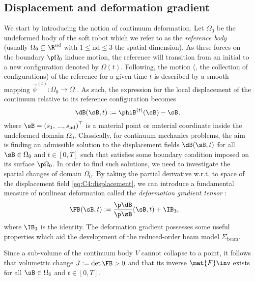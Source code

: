 \subsection{Displacement and deformation gradient}
We start by introducing the notion of continuum deformation. Let $\Omega_0$ be the undeformed body of the soft robot which we refer to as the \textit{reference body} (usually $\Omega_0 \subseteq \R^{\text{nd}}$ with $1 \le \text{nd} \le 3$ the spatial dimension). As these forces on the boundary $\p \Omega_0$ induce motion, the reference will transition from an initial to a new configuration denoted by $\Omega(t)$. Following, the motion (\ie, the collection of configurations) of the reference for a given time $t$ is described by a smooth mapping $\vec{\phi}^{(t)}: \Omega_0 \to \Omega$ \cite{Holzapfel2002,Kim2018,Laursen2001}.
As such, the expression for the local displacement of the continuum relative to its reference configuration becomes
%
\begin{equation}
\dB(\sB,t) := \phiB^{(t)}(\sB) - \sB,
\label{eq:C4:displacement}
\end{equation}
%
where $\sB = \left(s_1,\,...,s_{\textrm{nd}} \right)^\top$ is a material point or material coordinate inside the undeformed domain $\Omega_0$. Classically, for continuum mechanics problems, the aim is finding an admissible solution to the displacement fields $\dB(\sB,t)$ for all $\sB \in \Omega_0$ and $t \in [0,T]$ such that satisfies some boundary condition imposed on its surface $\p\Omega_0$. In order to find such solutions, we need to investigate the spatial changes of domain $\Omega_0$. By taking the partial derivative w.r.t. to space of the displacement field \eqref{eq:C4:displacement}, we can introduce a fundamental measure of nonlinear deformation called the \textit{deformation gradient tensor} \cite{Kim2018}:
%
\begin{align}
\FB(\sB,t) & := \frac{\p\dB}{\p \sB}(\sB,t) + \IB_3,
\label{eq:C4:deformationgradient}
\end{align}
%
where $\IB_3$ is the identity. The deformation gradient possesses some useful properties which aid the development of the reduced-order beam model $\Sigma_{\textrm{beam}}$. 
\begin{prop}[Finiteness]
\label{prop:C4:finiteness}
Since a sub-volume of the continuum body $V$ cannot collapse to a point, it follows that volumetric change $J := \det{\FB} > 0$ and that its inverse $\mat{F}\inv$ exists for all $\sB \in \Omega_0$ and $t \in [0,T]$. 
\end{prop} 

